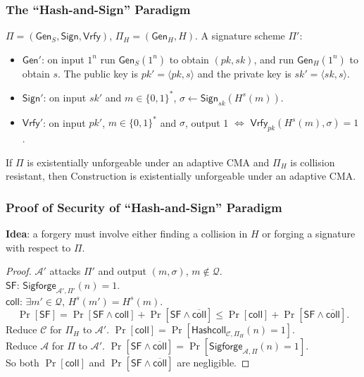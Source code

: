 \begin{frame}\frametitle{The ``Hash-and-Sign'' Paradigm}
\begin{construction}
$\Pi = (\mathsf{Gen}_S, \mathsf{Sign}, \mathsf{Vrfy})$, $\Pi_H = (\mathsf{Gen}_H, H)$. A signature scheme $\Pi'$:
\begin{itemize}
\item $\mathsf{Gen}'$: on input $1^n$ run $\mathsf{Gen}_S(1^n)$ to obtain $(pk,sk)$, and run $\mathsf{Gen}_H(1^n)$ to obtain $s$. The public key is $pk'=\langle pk,s\rangle$ and the private key is $sk' = \langle sk,s\rangle$.
\item $\mathsf{Sign}'$: on input $sk'$ and $m \in \{0,1\}^*$, $\sigma \gets \mathsf{Sign}_{sk}(H^s(m))$.
\item $\mathsf{Vrfy}'$: on input $pk'$, $m \in \{0,1\}^*$ and $\sigma$, output 1 $\iff$ $\mathsf{Vrfy}_{pk}(H^s(m),\sigma)=1$.
\end{itemize}
\end{construction}
\begin{theorem}
If $\Pi$ is existentially unforgeable under an adaptive CMA and $\Pi_H$ is collision resistant, then Construction is existentially unforgeable under an adaptive CMA.
\end{theorem}
\end{frame}
\begin{frame}\frametitle{Proof of Security of ``Hash-and-Sign'' Paradigm}
\textbf{Idea}: a forgery must involve either finding a collision in $H$ or forging a signature with respect to $\Pi$.
\begin{proof}
$\mathcal{A}'$ attacks $\Pi'$ and output $(m,\sigma)$, $m\notin \mathcal{Q}$.\\
$\mathsf{SF}$: $\mathsf{Sigforge}_{\mathcal{A}',\Pi'}(n)=1$.\\
$\mathsf{coll}$: $\exists m' \in \mathcal{Q}$, $H^s(m')=H^s(m)$.
\[\Pr[\mathsf{SF}] = \Pr[\mathsf{SF} \land \mathsf{coll}] + \Pr[\mathsf{SF} \land \overline{\mathsf{coll}}] \le \Pr[\mathsf{coll}]+\Pr[\mathsf{SF} \land \overline{\mathsf{coll}}].\]
Reduce $\mathcal{C}$ for $\Pi_H$ to $\mathcal{A}'$. $\Pr[\mathsf{coll}] = \Pr[\mathsf{Hashcoll}_{\mathcal{C},\Pi_H}(n)=1]$. \\
Reduce $\mathcal{A}$ for $\Pi$ to $\mathcal{A}'$.
$\Pr[\mathsf{SF} \land \overline{\mathsf{coll}}] = \Pr[\mathsf{Sigforge}_{\mathcal{A},\Pi}(n)=1]$.\\
So both $\Pr[\mathsf{coll}]$ and $\Pr[\mathsf{SF} \land \overline{\mathsf{coll}}]$ are negligible.
\end{proof}
\end{frame}
